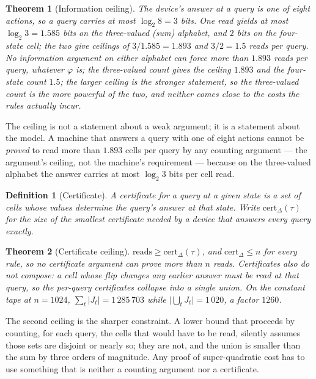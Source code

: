 \documentclass[11pt]{article}
\newtheorem{theorem}{Theorem}
\newtheorem{definition}{Definition}
\theoremstyle{remark}
\begin{document}
\begin{theorem}[Information ceiling]\label{thm:info}
The device's answer at a query is one of eight actions, so a query carries at most $\log_{2}8=3$
bits. One read yields at most $\log_{2}3=1.585$ bits on the three-valued (sum) alphabet, and $2$
bits on the four-state cell; the two give ceilings of $3/1.585=1.893$ and $3/2=1.5$ reads per query.
No information argument on either alphabet can force more than $1.893$ reads per query, whatever
$\varphi$ is; the three-valued count gives the ceiling $1.893$ and the four-state count $1.5$; the larger ceiling is
the stronger statement, so the three-valued count is the more powerful of the two, and neither comes
close to the costs the rules actually incur.
\end{theorem}

The ceiling is not a statement about a weak argument; it is a statement about the model. A machine
that answers a query with one of eight actions cannot be \emph{proved} to read more than $1.893$ cells
per query by any counting argument --- the argument's ceiling, not the machine's requirement ---
because on the three-valued alphabet the answer carries at most $\log_2 3$ bits per cell read.

\begin{definition}[Certificate]\label{def:cert}
A \emph{certificate} for a query at a given state is a set of cells whose values determine the query's
answer at that state.  Write $\mathrm{cert}_{\Delta}(\tau)$ for the size of the smallest certificate
needed by a device that answers every query exactly.
\end{definition}

\begin{theorem}[Certificate ceiling]\label{thm:cert}
$\mathrm{reads}\ge\mathrm{cert}_{\Delta}(\tau)$, and $\mathrm{cert}_{\Delta}\le n$ for every rule, so
no certificate argument can prove more than $n$ reads. Certificates also do not compose: a cell whose
flip changes any earlier answer must be read at that query, so the per-query certificates collapse
into a single union. On the constant tape at $n=1024$,
$\sum_{t}\lvert J_{t}\rvert=1\,285\,703$ while $\lvert\bigcup_{t}J_{t}\rvert=1\,020$, a factor
$1260$.
\end{theorem}

The second ceiling is the sharper constraint. A lower bound that proceeds by counting, for each
query, the cells that would have to be read, silently assumes those sets are disjoint or nearly so;
they are not, and the union is smaller than the sum by three orders of magnitude. Any proof of
super-quadratic cost has to use something that is neither a counting argument nor a certificate.
\end{document}

